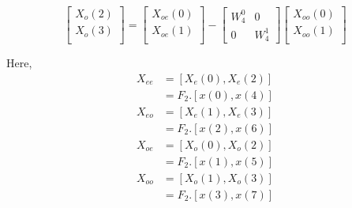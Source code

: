 \documentclass{beamer}
\begin{document}
\begin{frame}
\begin{equation}
\begin{bmatrix}
X_{o}(2) \\ 
X_{o}(3)\\ 
\end{bmatrix}
=
\begin{bmatrix}
X_{oe}(0) \\ 
X_{oe}(1)\\ 
\end{bmatrix}
-
\begin{bmatrix}
W^{0}_{4} & 0\\
0 & W^{1}_{4}
\end{bmatrix}
\begin{bmatrix}
X_{oo}(0) \\ 
X_{oo}(1) \\ 
\end{bmatrix}
\end{equation}
\end{frame}
\begin{frame}
    

Here,
\begin{align}
    X_{ee} &= [X_{e}(0),X_{e}(2)] \\
    &=F_{2}.[x(0),x(4)]
\end{align}
\begin{align}
    X_{eo} &= [X_{e}(1),X_{e}(3)]\\
    &=F_{2}.[x(2),x(6)]
\end{align}
\begin{align}
    X_{oe} &= [X_{o}(0),X_{o}(2)] \\
    &=F_{2}.[x(1),x(5)]
\end{align}
\begin{align}
    X_{oo} &= [X_{o}(1),X_{o}(3)]\\
    &=F_{2}.[x(3),x(7)]
\end{align}
\end{frame}
\end{document}

